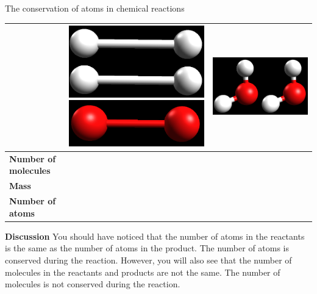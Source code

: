 \begin{activity}{The conservation of atoms in chemical reactions }
\begin{table}[H]
\begin{center}
\begin{tabular}{|l|l||l|}
& \includegraphics[width=.1\textwidth]{photos/hydrogen.png} \includegraphics[width=.1\textwidth]{photos/oxygen.png} & \includegraphics[width=.1\textwidth]{photos/water.png} \\ \hline
   \textbf{Number of molecules} &  &  \\ \hline
\textbf{Mass} &  &  \\ \hline
\textbf{Number of atoms} &  &  \\ \hline
  \end{tabular}

 \end{center}

\end{table}

      \label{m38711*id65031}\noindent{}\textbf{Discussion}
     You should have noticed that the number of atoms in the reactants is the same as the number of atoms in the product. The number of atoms is conserved during the reaction. However, you will also see that the number of molecules in the reactants and products are not the same. The number of molecules is not conserved during the reaction.
 \par 
\end{activity}
\label{m38711*eip-14}

